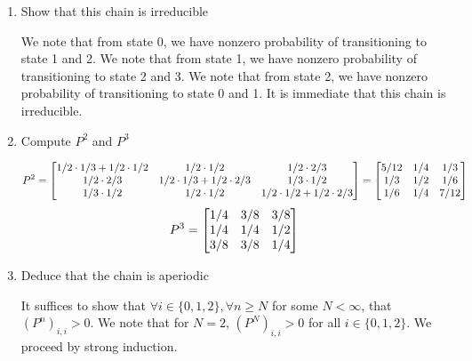 \documentclass[12pt,twoside, letter]{exam}
\theoremstyle{definition}
\begin{document}
\begin{enumerate}
  \item Show that this chain is irreducible
    \begin{solution}
      We note that from state 0, we have nonzero probability of transitioning to state 1 and 2. We note that from state 1, we have nonzero probability of transitioning to state 2 and 3.
      We note that from state 2, we have nonzero probability of transitioning to state 0 and 1. It is immediate that this chain is irreducible.
    \end{solution}
  \item Compute $P^2$ and $P^3$
    \begin{solution}
      \begin{align*}
        \centering
        P^2 =
          \begin{bmatrix}
            1/2\cdot 1/3 + 1/2 \cdot 1/2 & 1/2 \cdot 1/2 & 1/2 \cdot 2/3 \\
            1/2 \cdot 2/3 & 1/2 \cdot 1/3 + 1/2 \cdot 2/3 & 1/3 \cdot 1/2 \\
            1/3 \cdot 1/2 & 1/2 \cdot 1/2& 1/2 \cdot 1/2 + 1/2 \cdot 2/3
          \end{bmatrix}
            =
            \begin{bmatrix}
              5/12 & 1/4 & 1/3 \\
              1/3 & 1/2 & 1/6 \\
              1/6 & 1/4 & 7/12
            \end{bmatrix}
      \end{align*}
      \begin{align*}
        \centering
        P^3 =
            \begin{bmatrix}
              1/4 & 3/8 & 3/8 \\
              1/4 & 1/4 & 1/2 \\
              3/8 & 3/8 & 1/4
            \end{bmatrix}
      \end{align*}
    \end{solution}
  \item Deduce that the chain is aperiodic
    \begin{solution}
      It suffices to show that $\forall i \in \{0,1,2\}, \forall n \geq N$ for some $N < \infty$, that $(P^{n})_{i,i} > 0$.
      We note that for $N = 2$, $(P^{N})_{i,i} > 0$ for all $i \in \{0,1,2\}$. We proceed by strong induction.
    \end{solution}

\end{enumerate}
\end{document}
